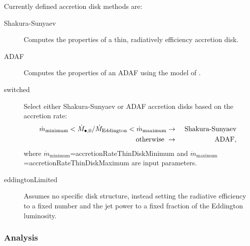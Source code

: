 Currently defined accretion disk methods are:
\begin{description}
 \item [{\normalfont \ttfamily Shakura-Sunyaev}] Computes the properties of a thin, radiatively efficiency accretion disk.
 \item [{\normalfont \ttfamily ADAF}] Computes the properties of an ADAF using the model of \cite{benson_maximum_2009}.
 \item [{\normalfont \ttfamily switched}] Select either {\normalfont \ttfamily Shakura-Sunyaev} or {\normalfont \ttfamily ADAF} accretion disks based on the accretion rate:
 \begin{eqnarray}
  \dot{m}_\mathrm{minimum} < \dot{M}_{\bullet, 0}/\dot{M}_\mathrm{Eddington} < \dot{m}_\mathrm{maximum} &\rightarrow& \hbox{ Shakura-Sunyaev} \nonumber \\
  \hbox{otherwise } &\rightarrow& \hbox{ ADAF},
 \end{eqnarray}
 where $\dot{m}_\mathrm{minimum}$={\normalfont \ttfamily accretionRateThinDiskMinimum} and $\dot{m}_\mathrm{maximum}$={\normalfont \ttfamily accretionRateThinDiskMaximum} are input parameters.
 \item [{\normalfont \ttfamily eddingtonLimited}] Assumes no specific disk structure, instead setting the radiative efficiency to a fixed number and the jet power to a fixed fraction of the Eddington luminosity.
\end{description}

\subsubsection{Analysis}

